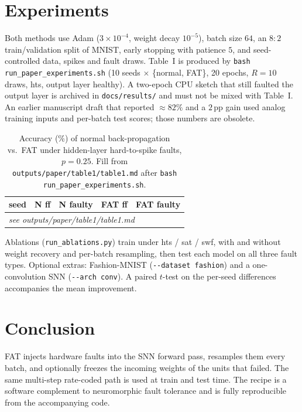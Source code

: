 \documentclass[conference]{IEEEtran}
\begin{document}
\section{Experiments}

Both methods use Adam ($3\times 10^{-4}$, weight decay $10^{-5}$), batch
size $64$, an $8{:}2$ train/validation split of MNIST, early stopping
with patience $5$, and seed-controlled data, spikes and fault draws.
Table~I is produced by \texttt{bash run\_paper\_experiments.sh}
(10 seeds $\times$ \{normal, FAT\}, 20 epochs, $R=10$ draws, hts,
output layer healthy). A two-epoch CPU sketch that still faulted the
output layer is archived in \texttt{docs/results/} and must not be mixed
with Table~I. An earlier manuscript draft that reported $\approx 82\%$
and a $2$\,pp gain used analog training inputs and per-batch test
scores; those numbers are obsolete.

\begin{table}[t]
\caption{Accuracy (\%) of normal back-propagation vs.\ FAT under
hidden-layer hard-to-spike faults, $p=0.25$. Fill from
\texttt{outputs/paper/table1/table1.md} after
\texttt{bash run\_paper\_experiments.sh}.}
\label{tab:table1}
\centering
\begin{tabular}{crrrr}
\toprule
seed & N ff & N faulty & FAT ff & FAT faulty \\
\midrule
\multicolumn{5}{l}{\textit{see outputs/paper/table1/table1.md}} \\
\bottomrule
\end{tabular}
\end{table}

Ablations (\texttt{run\_ablations.py}) train under hts / sat / swf, with
and without weight recovery and per-batch resampling, then test each
model on all three fault types. Optional extras: Fashion-MNIST
(\texttt{-{}-dataset fashion}) and a one-convolution SNN
(\texttt{-{}-arch conv}). A paired $t$-test on the per-seed differences
accompanies the mean improvement.

\section{Conclusion}

FAT injects hardware faults into the SNN forward pass, resamples them
every batch, and optionally freezes the incoming weights of the units
that failed. The same multi-step rate-coded path is used at train and
test time. The recipe is a software complement to neuromorphic fault
tolerance and is fully reproducible from the accompanying code.
\end{document}

